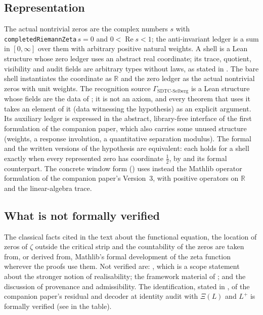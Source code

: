 \documentclass[11pt]{article}
\DeclareMathOperator{\Real}{Re}
\newcommand{\GamSDTCSelberg}{\Gamma_{\mathrm{SDTC\text{-}Selberg}}}
\theoremstyle{definition}
\begin{document}
\subsection*{Representation}

The actual nontrivial zeros are the complex numbers \(s\) with
\texttt{completedRiemannZeta}\,\(s=0\) and \(0<\Real s<1\); the
anti-invariant ledger is a sum in \([0,\infty]\) over them with arbitrary
positive natural weights.  A shell is a Lean structure whose zero ledger
uses an abstract real coordinate; its trace, quotient, visibility and
audit fields are arbitrary types without laws, as stated in
.  The bare shell instantiates the coordinate as
\(\mathbb R\) and the zero ledger as the actual nontrivial zeros with
unit weights.  The recognition source \(\GamSDTCSelberg\) is a Lean
structure whose fields are the data of
; it is not an axiom, and every theorem
that uses it takes an element of it (data witnessing the hypothesis)
as an explicit argument.  Its
auxiliary ledger is expressed in the abstract, library-free interface
of the first formulation of the companion paper, which also carries some unused structure (weights, a response involution, a
quantitative separation modulus).  The formal and the written versions
of the hypothesis are equivalent: each holds for a shell exactly when
every represented zero has coordinate \(\frac12\), by
 and its formal counterpart.  The concrete window form
() uses instead the Mathlib operator
formulation of the companion paper's Version~3, with positive operators
on \(\mathbb R\) and the linear-algebra trace.

\subsection*{What is not formally verified}

The classical facts cited in the text about the functional equation,
the location of zeros of \(\zeta\) outside the critical strip and the
countability of the zeros are taken from, or derived from, Mathlib's
formal development of the zeta function wherever the proofs use them.  Not verified are: , which is a scope
statement about the stronger notion of realisability; the framework
material of ; and the discussion of
provenance and admissibility.  The identification, stated in
, of the companion paper's residual and
decoder at identity audit with \(\Xi(L)\) and \(L^+\) is formally
verified (see  in the table).
\end{document}
